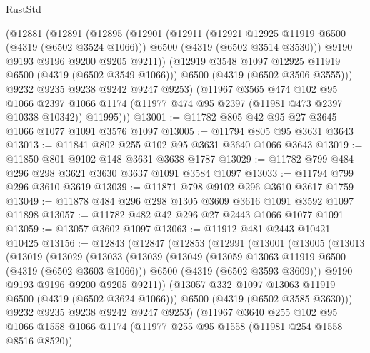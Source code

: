 \begin{lexlean}{RustStd}
\begin{coremodule}
        (@12881
          (@12891
            (@12895
              (@12901
                (@12911
                  (@12921 @12925 @11919 @6500 (@4319 (@6502 @3524 @1066)))
                  @6500
                  (@4319 (@6502 @3514 @3530)))
                @9190
                @9193
                @9196
                @9200
                @9205
                @9211))
            (@12919 @3548 @1097 @12925 @11919 @6500 (@4319 (@6502 @3549 @1066)))
            @6500
            (@4319 (@6502 @3506 @3555)))
          @9232
          @9235
          @9238
          @9242
          @9247
          @9253)
        (@11967
          @3565
          @474
          @102
          @95
          @1066
          @2397
          @1066
          @1174
          (@11977 @474 @95 @2397 (@11981 @473 @2397 @10338 @10342))
          @11995)))
@13001 := @11782 @805 @42 @95 @27 @3645 @1066 @1077 @1091 @3576 @1097
@13005 := @11794 @805 @95 @3631 @3643
@13013 := @11841 @802 @255 @102 @95 @3631 @3640 @1066 @3643
@13019 := @11850 @801 @9102 @148 @3631 @3638 @1787
@13029 := @11782 @799 @484 @296 @298 @3621 @3630 @3637 @1091 @3584 @1097
@13033 := @11794 @799 @296 @3610 @3619
@13039 := @11871 @798 @9102 @296 @3610 @3617 @1759
@13049 := @11878 @484 @296 @298 @1305 @3609 @3616 @1091 @3592 @1097 @11898
@13057 := @11782 @482 @42 @296 @27 @2443 @1066 @1077 @1091
@13059 := @13057 @3602 @1097
@13063 := @11912 @481 @2443 @10421 @10425
@13156 := @12843
    (@12847
      (@12853
        (@12991
          (@13001
            (@13005
              (@13013
                (@13019
                  (@13029
                    (@13033
                      (@13039
                        (@13049
                          (@13059 @13063 @11919 @6500 (@4319 (@6502 @3603 @1066)))
                          @6500
                          (@4319 (@6502 @3593 @3609)))
                        @9190
                        @9193
                        @9196
                        @9200
                        @9205
                        @9211))
                    (@13057 @332 @1097 @13063 @11919 @6500 (@4319 (@6502 @3624 @1066)))
                    @6500
                    (@4319 (@6502 @3585 @3630)))
                  @9232
                  @9235
                  @9238
                  @9242
                  @9247
                  @9253)
                (@11967
                  @3640
                  @255
                  @102
                  @95
                  @1066
                  @1558
                  @1066
                  @1174
                  (@11977 @255 @95 @1558 (@11981 @254 @1558 @8516 @8520))

\end{coremodule}
\end{lexlean}
